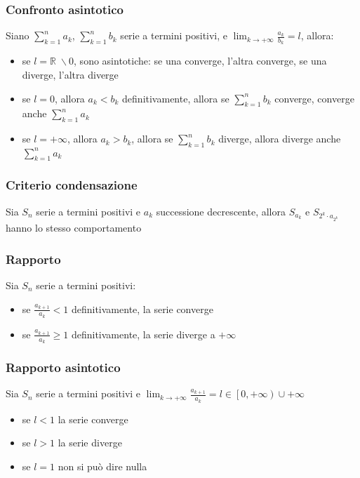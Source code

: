 \documentclass[a4paper]{article}
\begin{document}
\subsubsection*{Confronto asintotico}
Siano \(\displaystyle \sum_{k = 1}^{n} a_k\), \(\displaystyle \sum_{k = 1}^{n} b_k\) serie a termini positivi, e \(\displaystyle \lim_{k \to +\infty} \frac{a_k}{b_k} = l\), allora:
\begin{itemize}
	\item se \(l = \mathbb{R} \; \backslash 0\), sono asintotiche: se una converge, l'altra converge, se una diverge, l'altra diverge
	\item se \(l = 0\), allora \(a_k < b_k\) definitivamente, allora se \(\sum_{k = 1}^{n} b_k\) converge, converge anche \(\sum_{k = 1}^{n} a_k\)
	\item se \(l = +\infty\), allora \(a_k > b_k\), allora se \(\sum_{k = 1}^{n} b_k\) diverge, allora diverge anche \(\sum_{k = 1}^{n} a_k\)
\end{itemize}

\subsubsection*{Criterio condensazione}
Sia \(S_n\) serie a termini positivi e \(a_k\) successione decrescente, allora \(S_{a_k}\) e \(\displaystyle S_{2^k \cdot a_{2^k}}\) hanno lo stesso comportamento

\subsubsection*{Rapporto}
Sia \(S_n\) serie a termini positivi:
\begin{itemize}
	\item se \(\displaystyle \frac{a_{k + 1}}{a_k} < 1\) definitivamente, la serie converge
	\item se \(\displaystyle \frac{a_{k + 1}}{a_k} \geq 1\) definitivamente, la serie diverge a \(+ \infty\)
\end{itemize}

\subsubsection*{Rapporto asintotico}
Sia \(S_n\) serie a termini positivi e \(\displaystyle \lim_{k \to +\infty} \frac{a_{k+1}}{a_k} = l \in \left[0, +\infty \right) \cup +\infty \)
\begin{itemize}
	\item se \(l < 1\) la serie converge
	\item se \(l > 1\) la serie diverge
	\item se \(l = 1\) non si può dire nulla
\end{itemize}
\end{document}
